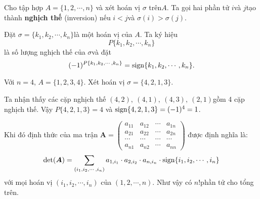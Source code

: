 \begin{definition}
    Cho tập hợp $A = \{1, 2, \cdots, n\}$ và xét hoán vị $\sigma$ trên ​$A$. Ta gọi hai phần tử $i$​ và $j$​ tạo thành \textbf{nghịch thế} (inversion) nếu $i < j$​ và $\sigma(i) > \sigma(j)$.

    Đặt $\sigma = \{k_1, k_2, \cdots, k_n\}$​ là một hoán vị của $A$​. Ta ký hiệu \[ P\{k_1, k_2, \cdots, k_n\} \] là số lượng nghịch thế của $\sigma$​ và đặt \[ (-1)^{P\{k_1, k_2, \cdots, k_n\}} = \operatorname{sign} \{k_1, k_2, \cdots, k_n\}. \]
\end{definition}

\begin{example}
    Với $n=4$​, $A = \{1, 2, 3, 4\}$​. Xét hoán vị $\sigma = \{4, 2, 1, 3\}$.

    Ta nhận thấy các cặp nghịch thế $(4, 2),\ (4, 1),\ (4, 3),\ (2, 1)$​ gồm 4 cặp nghịch thế. Vậy $P\{4, 2, 1, 3\} = 4$ và $\operatorname{sign} \{4, 2, 1, 3\}=(-1)^4=1$​.
\end{example}

\begin{definition}
    Khi đó định thức của ma trận $\bm{A} = \begin{pmatrix}a_{11} & a_{12} & \cdots & a_{1n} \\ a_{21} & a_{22} & \cdots & a_{2n} \\ \cdots & \cdots & \cdots & \cdots \\ a_{n1} & a_{n2} & \cdots & a_{nn}\end{pmatrix}$ được định nghĩa là:
    \begin{equation}
        \det(\bm{A})=\displaystyle{\sum_{(i_1, i_2, \cdots, i_n)} a_{1, i_1} \cdot a_{2, i_2} \cdot a_{n, i_n} \cdot \operatorname{sign}\{i_1, i_2, \cdots, i_n\}}
    \end{equation}
    với mọi hoán vị $(i_1, i_2, \cdots, i_n)$ của $(1, 2, \cdots, n)$. Như vậy có $n!$​ phần tử cho tổng trên.
\end{definition}

